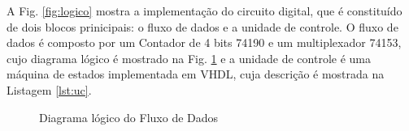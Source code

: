 \documentclass[a4,12pt]{horizon-theme}
\begin{document}
A Fig. \ref{fig:logico} mostra a implementação do circuito digital, que é constituído de dois blocos prinicipais: o fluxo de dados e a unidade de controle. O fluxo de dados é composto por um Contador de 4 bits 74190 e um multiplexador 74153, cujo diagrama lógico é mostrado na Fig. \ref{fig:logico_fd} e a unidade de controle é uma máquina de estados implementada em VHDL, cuja descrição é mostrada na Listagem \ref{lst:uc}.

\begin{figure}[!ht]
    \centering
    \caption{Diagrama lógico do Fluxo de Dados}
    \label{fig:logico_fd}
\end{figure}
\end{document}
